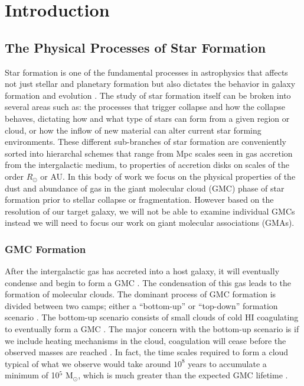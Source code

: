 \chapter{Introduction}\label{intro}

\section{The Physical Processes of Star Formation} %

Star formation is one of the fundamental processes in astrophysics that affects not just stellar and planetary formation but also dictates the behavior in galaxy formation and evolution \citep{kennicutt2012}.  The study of star formation itself can be broken into several areas such as: the processes that trigger collapse and how the collapse behaves, dictating how and what type of stars can form from a given region or cloud, or how the inflow of new material can alter current star forming environments.  These different sub-branches of star formation are conveniently sorted into hierarchal schemes that range from Mpc scales seen in gas accretion from the intergalactic medium, to properties of accretion disks on scales of the order $R_\odot$ or AU\citep{kennicutt2012}.  In this body of work we focus on the physical properties of the dust and abundance of gas in the giant molecular cloud (GMC) phase of star formation prior to stellar collapse or fragmentation.  However based on the resolution of our target galaxy, we will not be able to examine individual GMCs instead we will need to focus our work on giant molecular associations (GMAs).

\subsection{GMC Formation}

After the intergalactic gas has accreted into a host galaxy, it will eventually condense and begin to form a GMC \citep{kennicutt2012}.  The condensation of this gas leads to the formation of molecular clouds.  The dominant process of GMC formation is divided between two camps; either a ``bottom-up'' or ``top-down'' formation scenario \citep{mckee2007}.  The bottom-up scenario consists of small clouds of cold HI coagulating to eventually form a GMC \citep{field1965, kwan1979}.  The major concern with the bottom-up scenario is if we include heating mechanisms in the cloud, coagulation will cease before the observed masses are reached \citep{mckee2007}.  In fact, the time scales required to form a cloud typical of what we observe would take around $10^8$ years to accumulate a minimum of 10$^5$ M$_\odot$, which is much greater than the expected GMC lifetime \citep{mckee2007}.  %

